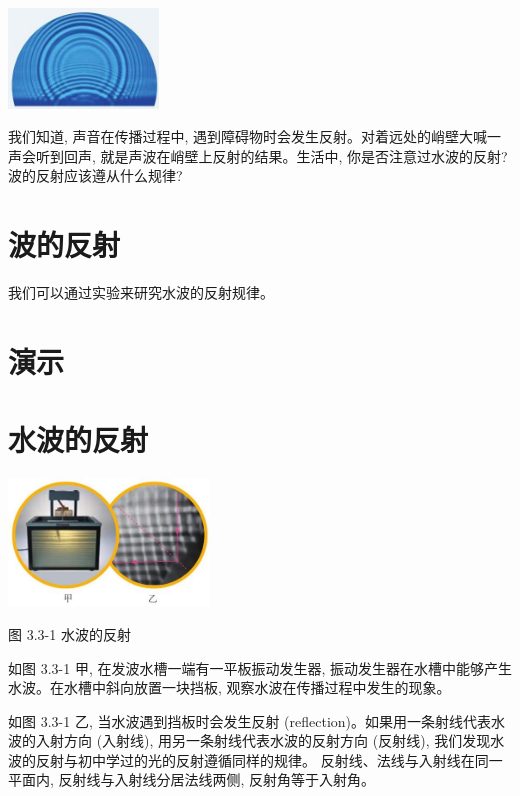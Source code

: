 \documentclass[10pt]{article}
\begin{document}
\begin{center}
\includegraphics[max width=0.3\textwidth]{images/01910e4c-ebb8-7d2c-8f2f-2375bc1d2d12_76_580141.jpg}
\end{center}

我们知道, 声音在传播过程中, 遇到障碍物时会发生反射。对着远处的峭壁大喊一声会听到回声, 就是声波在峭壁上反射的结果。生活中, 你是否注意过水波的反射? 波的反射应该遵从什么规律?

\section*{波的反射}

我们可以通过实验来研究水波的反射规律。

\section*{演示}

\section*{水波的反射}

\begin{center}
\includegraphics[max width=0.4\textwidth]{images/01910e4c-ebb8-7d2c-8f2f-2375bc1d2d12_76_159167.jpg}
\end{center}

图 3.3-1 水波的反射

如图 3.3-1 甲, 在发波水槽一端有一平板振动发生器, 振动发生器在水槽中能够产生水波。在水槽中斜向放置一块挡板, 观察水波在传播过程中发生的现象。

如图 3.3-1 乙, 当水波遇到挡板时会发生反射 (reflection)。如果用一条射线代表水波的入射方向 (入射线), 用另一条射线代表水波的反射方向 (反射线), 我们发现水波的反射与初中学过的光的反射遵循同样的规律。 反射线、法线与入射线在同一平面内, 反射线与入射线分居法线两侧, 反射角等于入射角。
\end{document}
